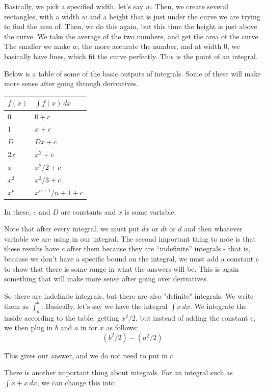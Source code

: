 \documentclass{memoir}
\begin{document}
Basically, we pick a specified width, let's say $w$. 
Then, we create several rectangles, with a width $w$ and a height that is just under the curve we are trying to find the area of. 
Then, we do this again, but this time the height is just above the curve. 
We take the average of the two numbers, and get the area of the curve. 
The smaller we make $w$, the more accurate the number, and at width $0$, we basically have lines, which fit the curve perfectly. 
This is the point of an integral.

Below is a table of some of the basic outputs of integrals. Some of these will make more sense after going through derivatives.

\begin{tabular}{l|l}
    $f(x)$ & $\int f(x) \, dx$\\
    \hline
     $0$ & $0+c$ \\
     $1$ & $x+c$ \\
     $D$ & $Dx+c$ \\
     $2x$ & $x^2 + c$ \\
     $x$ & $x^2/2 + c$ \\
     $x^2$ & $x^3/3 + c$ \\
     $x^n$ & $x^{n+1}/n+1 + c$
\end{tabular}

In these, $c$ and $D$ are constants and $x$ is some variable.

Note that after every integral, we must put $dx$ or $dt$ or $d$ and then whatever variable we are using in our integral. 
The second important thing to note is that these results have $c$ after them because they are ``indefinite'' integrals - that is, because we don't have a specific bound on the integral, we must add a constant $c$ to show that there is some range in what the answers will be. 
This is again something that will make more sense after going over derivatives.

So there are indefinite integrals, but there are also "definite" integrals. 
We write them as $\int^b_a$. Basically, let's say we have the integral $\int x \, dx$. 
We integrate the inside according to the table, getting $x^2/2$, but instead of adding the constant $c$, we then plug in $b$ and $a$ in for $x$ as follows: 
\begin{equation*}
    (b^2/2) - (a^2/2)
\end{equation*}

This gives our answer, and we do not need to put in $c$.

There is another important thing about integrals. For an integral such as $\int x+x \, dx$, we can change this into
\end{document}
